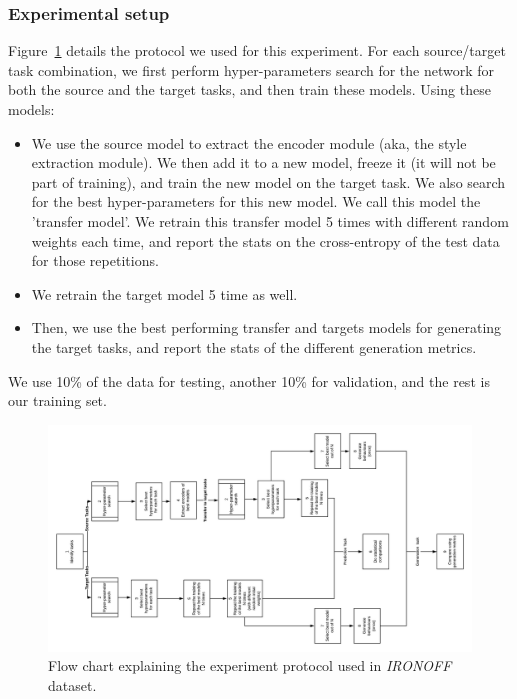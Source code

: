     \subsubsection{Experimental setup}
      \par Figure~\ref{fig:ironoff_protocol} details the protocol we used for this experiment. For each source/target task combination, we first perform hyper-parameters search for the network for both the source and the target tasks, and then train these models. Using these models:
      \begin{itemize}
        \item We use the source model to extract the encoder module (aka, the style extraction module). We then add it to a new model, freeze it (it will not be part of training), and train the new model on the target task. We also search for the best hyper-parameters for this new model. We call this model the 'transfer model'. We retrain this transfer model 5 times with different random weights each time, and report the stats on the cross-entropy of the test data for those repetitions.
        \item We retrain the target model 5 time as well.
        \item Then, we use the best performing transfer and targets models for generating the target tasks, and report the stats of the different generation metrics.
      \end{itemize}
      \par We use 10\% of the data for testing, another 10\% for validation, and the rest is our training set.

    \begin{figure}
      \includegraphics[scale=0.3]{images/sota/ironoff_results/IRONOFF_transfer_learning_flow.png}
      \caption[\textit{IRONOFF} experimental protocol]{Flow chart explaining the experiment protocol used in \textit{IRONOFF} dataset.}
      \label{fig:ironoff_protocol}
    \end{figure}

